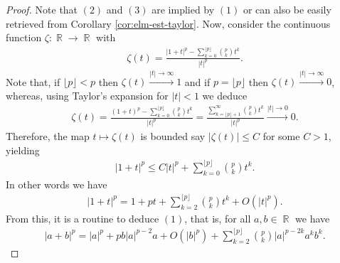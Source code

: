 \documentclass[12pt, reqno]{amsart}%
\theoremstyle{plain}  %
\theoremstyle{definition}  %
\numberwithin{equation}{section}
\DeclareMathOperator{\R}{\mathbb{R}}
\begin{document}
\begin{proof}
Note that  $(2)$ and $(3)$  are implied by $(1)$ or can also  be easily retrieved from Corollary \ref{cor:elm-est-taylor}.  Now, consider the  continuous function $\zeta:\R\to \R$ with
\begin{align*}
\zeta(t)=\frac{|1+t|^p-  \sum_{k=0}^{\lfloor p\rfloor}\binom{p}{k}t^{k} }{|t|^p}.
\end{align*}
Note that, if $\lfloor p\rfloor<p$ then $\zeta(t)\xrightarrow{|t|\to\infty}1$  and if $p=\lfloor p\rfloor$  then $\zeta(t)\xrightarrow{|t|\to\infty}0$,
whereas,  using Taylor's expansion for $|t|<1$ we deduce
\begin{align*}
\zeta(t)=\frac{(1+t)^p-  \sum_{k=0}^{\lfloor p\rfloor}\binom{p}{k}t^{k} }{|t|^p}
= \frac{\sum_{k=\lfloor p\rfloor+1}^\infty\binom{p}{k}t^{k} }{|t|^p}\xrightarrow{|t|\to0}0.
\end{align*}
Therefore, the map $t\mapsto\zeta(t)$ is bounded say $|\zeta(t)|\leq C$ for some $C>1$, yielding
\begin{align*}
|1+t|^p\leq C|t|^p+ \sum_{k=0}^{\lfloor p\rfloor}\binom{p}{k}t^{k}.
\end{align*}
In other words we have
\begin{align*}
|1+t|^p= 1+pt+ \sum_{k=2}^{\lfloor p\rfloor}\binom{p}{k}t^{k}+  O(|t|^p).
\end{align*}
From this, it is a routine to deduce $(1)$, that is,  for all $a,b\in\R$  we have
\begin{align*}
|a+b|^p= |a|^p+ pb|a|^{p-2}a+O(|b|^p)+ \sum_{k=2}^{\lfloor p\rfloor}\binom{p}{k}|a|^{p-2k} a^{k}b^{k}.
\end{align*}
\end{proof}
\end{document}
